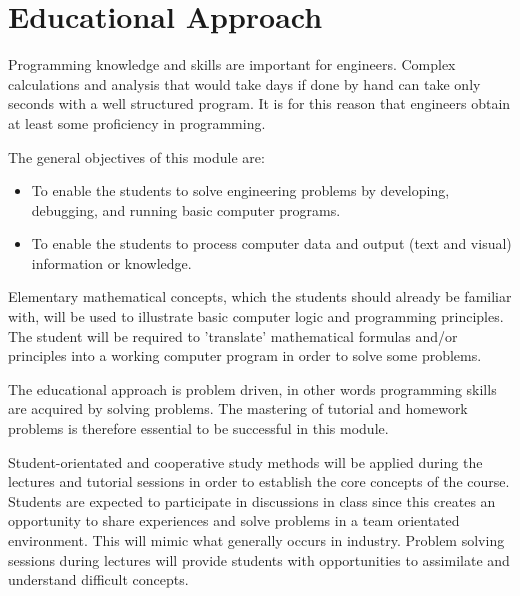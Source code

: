 \section{Educational Approach}
    
    Programming knowledge and skills are important for engineers. Complex calculations 
    and analysis that would take days if done by hand can take only seconds with a well 
    structured program. It is for this reason that engineers obtain at least some 
    proficiency in programming.

    The general objectives of this module are:
    \begin{itemize}
        \item To enable the students to solve engineering problems by developing, 
              debugging, and running basic computer programs.
        \item To enable the students to process computer data and output (text and
              visual) information or knowledge.
    \end{itemize}

    Elementary mathematical concepts, which the students should
    already be familiar with, will be used to illustrate basic
    computer logic and programming principles. The student will be
    required to 'translate' mathematical formulas and/or principles
    into a working computer program in order to solve some problems.

    The educational approach is problem driven, in other words
    programming skills are acquired by solving problems. The mastering
    of tutorial and homework problems is therefore essential to be successful in 
    this module.
    
    Student-orientated and cooperative study methods will be applied during the
    lectures and tutorial sessions in order to establish the core concepts of 
    the course. Students are expected to participate in discussions in class since
    this creates an opportunity to share experiences and solve problems in a team 
    orientated environment. This will mimic what generally occurs in industry.
    Problem solving sessions during lectures will provide students with 
    opportunities to assimilate and understand difficult concepts.

